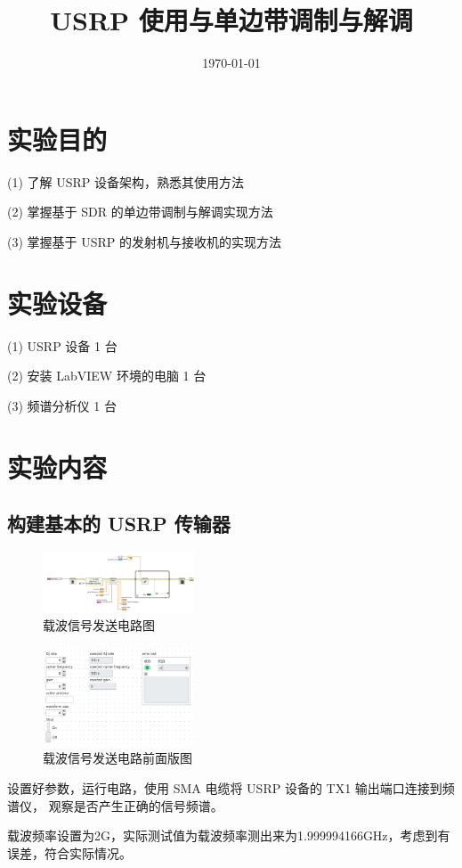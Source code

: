 \documentclass{../source/Experiment}
\title{USRP 使用与单边带调制与解调}
\date{\today}
\begin{document}
\makecover
\makeheader
\section{实验目的}
 (1) 了解 USRP 设备架构，熟悉其使用方法

(2) 掌握基于 SDR 的单边带调制与解调实现方法

(3) 掌握基于 USRP 的发射机与接收机的实现方法
\section{实验设备}

 (1) USRP 设备 1 台

(2) 安装 LabVIEW 环境的电脑 1 台

(3) 频谱分析仪 1 台


\section{实验内容}
\subsection{构建基本的 USRP 传输器}
\begin{figure}[H]
    \centering
    \includegraphics[width = 0.4\textwidth]{lab9/carrier.jpg}
    \caption{载波信号发送电路图}
\end{figure}
\begin{figure}[H]
    \centering
    \includegraphics[width = 0.4\textwidth]{lab9/carrier-b.jpg}
    \caption{载波信号发送电路前面版图}
\end{figure}

设置好参数，运行电路，使用 SMA 电缆将 USRP 设备的 TX1 输出端口连接到频谱仪， 观察是否产生正确的信号频谱。

载波频率设置为2G，实际测试值为载波频率测出来为1.999994166GHz，考虑到有误差，符合实际情况。
\end{document}
